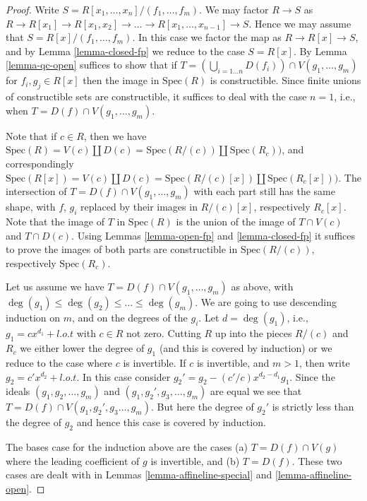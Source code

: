 \begin{proof}
Write $S = R[x_1,\ldots,x_n]/(f_1,\ldots,f_m)$.
We may factor $R \to S$ as $R \to R[x_1] \to R[x_1,x_2]
\to \ldots \to R[x_1,\ldots,x_{n-1}] \to S$. Hence 
we may assume that $S = R[x]/(f_1,\ldots,f_m)$.
In this case we factor the map as $R \to R[x] \to S$,
and by Lemma \ref{lemma-closed-fp} we reduce to
the case $S = R[x]$. By Lemma \ref{lemma-qc-open} suffices
to show that if
$T = (\bigcup_{i=1\ldots n} D(f_i)) \cap V(g_1,\ldots,g_m)$ 
for $f_i , g_j \in R[x]$ then the image in $\text{Spec}(R)$ is
constructible. Since finite unions of constructible sets
are constructible, it suffices to deal with the case $n=1$,
i.e., when $T = D(f) \cap V(g_1,\ldots,g_m)$.

\medskip\noindent
Note that if $c \in R$, then we have $\text{Spec}(R) =
V(c) \coprod D(c) = \text{Spec}(R/(c)) \coprod
\text{Spec}(R_c))$, and correspondingly $\text{Spec}(R[x]) =
V(c) \coprod D(c) = \text{Spec}(R/(c)[x]) \coprod 
\text{Spec}(R_c[x]))$. The intersection of $T = D(f) \cap V(g_1,\ldots,g_m)$
with each part still has the same shape, with $f$, $g_i$ replaced
by their images in $R/(c)[x]$, respectively $R_c[x]$.
Note that the image of $T$
in $\text{Spec}(R)$ is the union of the image of
$T \cap V(c)$ and $T \cap D(c)$. Using Lemmas \ref{lemma-open-fp}
and \ref{lemma-closed-fp} it suffices to prove the images of both
parts are constructible in $\text{Spec}(R/(c))$, respectively
$\text{Spec}(R_c)$.

\medskip\noindent
Let us assume we have $T = D(f) \cap V(g_1,\ldots,g_m)$
as above, with $\deg(g_1) \leq \deg(g_2) \leq \ldots \leq \deg(g_m)$.
We are going to use descending induction on $m$, and on the 
degrees of the $g_i$. Let $d = \deg(g_1)$, i.e., $g_1 = c x^{d_1} + l.o.t$
with $c \in R$ not zero. Cutting $R$ up into the pieces
$R/(c)$ and $R_c$ we either lower the degree of $g_1$ (and this
is covered by induction)
or we reduce to the case where $c$ is invertible.
If $c$ is invertible, and $m > 1$, then write
$g_2 = c' x^{d_2} + l.o.t$. In this case consider
$g_2' = g_2 - (c'/c) x^{d_2 - d_1} g_1$. Since the ideals
$(g_1, g_2, \ldots, g_m)$ and $(g_1, g_2', g_3, \ldots, g_m)$
are equal we see that $T = D(f) \cap V(g_1,g_2',g_3\ldots,g_m)$.
But here the degree of $g_2'$ is strictly less than the degree
of $g_2$ and hence this case is covered by induction.

\medskip\noindent
The bases case for the induction above are the cases
(a) $T = D(f) \cap V(g)$ where the leading coefficient
of $g$ is invertible, and (b) $T = D(f)$. These two cases
are dealt with in Lemmas \ref{lemma-affineline-special}
and \ref{lemma-affineline-open}.
\end{proof}











